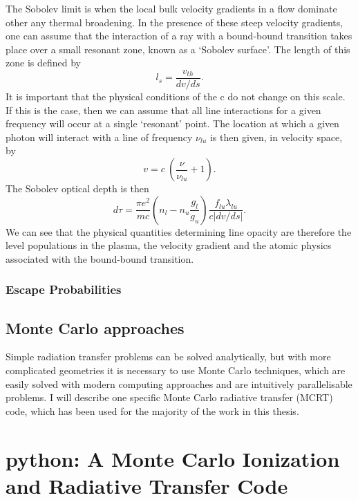 The Sobolev limit is when the local bulk velocity gradients in a flow 
dominate other any thermal broadening. In the presence of these steep
velocity gradients, one can assume that the interaction of a ray with a bound-bound
transition takes place over a small resonant zone, known as a 
`Sobolev surface'. The length of this zone is defined by
\begin{equation}
l_s = \frac{v_{th}}{dv / ds}.
\end{equation}
It is important that the physical conditions of the c do not change on this scale.
If this is the case, then we can assume that all line interactions for a given 
frequency will occur at a single `resonant' point. The location at which
a given photon will interact with a line of frequency $\nu_{lu}$
is then given, in velocity space, by
\begin{equation}
v = c~\left(\frac{\nu}{\nu_{lu}} + 1\right).
\end{equation}
The Sobolev optical depth is then
\begin{equation}
d \tau = \frac{\pi e^2}{m c}  \left(n_l - n_u \frac{g_l}{g_u} \right) \frac{f_{lu} \lambda_{lu}}{c | dv / ds |}.
\end{equation}
We can see that the physical quantities determining line opacity are therefore 
the level populations in the plasma, the velocity gradient and the atomic physics
associated with the bound-bound transition.



\subsubsection{Escape Probabilities}





\subsection{Monte Carlo approaches}

Simple radiation transfer problems can be solved analytically,
but with more complicated geometries it is necessary to use Monte Carlo
techniques, which are easily solved with modern computing approaches and 
are intuitively parallelisable problems. I will describe one specific 
Monte Carlo radiative transfer (MCRT) code, which has been used
for the majority of the work in this thesis.

\section{{\sc python}: A Monte Carlo Ionization and Radiative Transfer Code}

